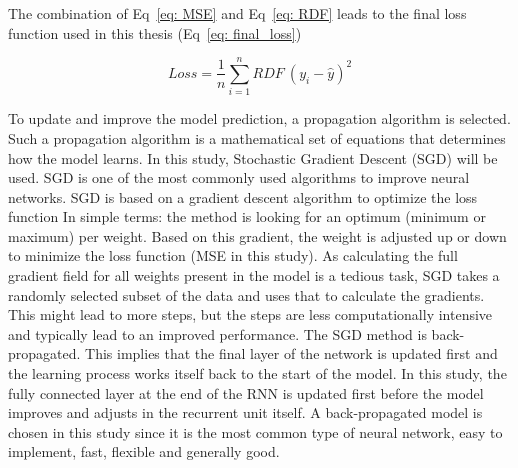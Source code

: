 \documentclass[twocolumn, 10pt, a4paper]{memoir}
\begin{document}
		The combination of Eq~\ref{eq: MSE} and Eq~\ref{eq: RDF} leads to the final loss function used in this thesis (Eq~\ref{eq: final_loss})
		
		\begin{equation}
			\label{eq: final_loss}
			Loss = \frac{1}{n} \sum_{i=1}^{n} RDF \ (y_i - \hat{y})^2 
		\end{equation}
	
		To update and improve the model prediction, a propagation algorithm is selected. Such a propagation algorithm is a mathematical set of equations that determines how the model learns. In this study, Stochastic Gradient Descent (SGD) will be used. SGD is one of the most commonly used algorithms to improve neural networks. SGD is based on a gradient descent algorithm to optimize the loss function In simple terms: the method is looking for an optimum (minimum or maximum) per weight. Based on this gradient, the weight is adjusted up or down to minimize the loss function (MSE in this study). As calculating the full gradient field for all weights present in the model is a tedious task, SGD takes a randomly selected subset of the data and uses that to calculate the gradients. This might lead to more steps, but the steps are less computationally intensive and typically lead to an improved performance.  
		The SGD method is back-propagated. This implies that the final layer of the network is updated first and the learning process works itself back to the start of the model. In this study, the fully connected layer at the end of the RNN is updated first before the model improves and adjusts in the recurrent unit itself. A back-propagated model is chosen in this study since it is the most common type of neural network, easy to implement, fast, flexible and generally good. 
		 
\end{document}
